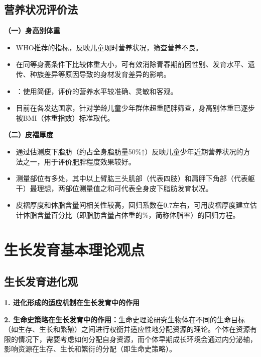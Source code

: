 \subsection{营养状况评价法}

\begin{keybox}
\textbf{（一）身高别体重}

\begin{itemize}[leftmargin=*]
    \item WHO推荐的指标，反映儿童现时营养状况，筛查营养不良。
    \item 在同等身高条件下比较体重大小，可有效消除青春期前因性别、发育水平、遗传、种族差异等原因导致的身材发育差异的影响。
    \item {}：使用简便，评价的营养水平较准确、灵敏和客观。
    \item 目前在各发达国家，针对学龄儿童少年群体超重肥胖筛查，身高别体重已逐步被BMI（体重指数）标准取代。
\end{itemize}

\textbf{（二）皮褶厚度}

\begin{itemize}[leftmargin=*]
    \item 通过估测皮下脂肪（约占全身脂肪量50\%↑）反映儿童少年近期营养状况的方法之一，用于评价肥胖程度效果较好。
    \item 测量部位有多处，其中以上臂肱三头肌部（代表四肢）和肩胛下角部（代表躯干）最理想，两部位测量值之和可代表全身皮下脂肪发育状况。
    \item 皮褶厚度和体脂含量间相关性较高，回归系数在0.7左右，可用皮褶厚度建立估计体脂含量百分比（即脂肪含量占体重的\%，简称体脂率）的回归方程。
\end{itemize}
\end{keybox}

\section{生长发育基本理论观点}

\subsection{生长发育进化观}

\begin{defbox}
\textbf{1. 进化形成的适应机制在生长发育中的作用}

\textbf{2. 生命史策略在生长发育中的作用：}生命史理论研究生物体在不同的生命目标（如生存、生长和繁殖）之间进行权衡并适应性地分配资源的理论。个体在资源有限的情况下，需要考虑如何分配自身资源，而个体早期成长环境会通过内分泌轴，影响资源在生存、生长和繁衍的分配（即生命史策略）。
\end{defbox}


